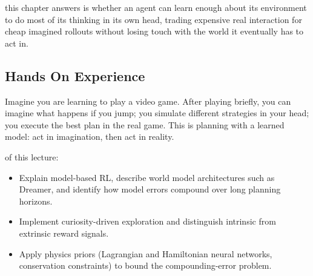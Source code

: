  this chapter answers is whether an agent can learn enough
about its environment to do most of its thinking in its own head,
trading expensive real interaction for cheap imagined rollouts
without losing touch with the world it eventually has to act in.

\newpage

\iffalse
\subsection{Hands On Experience}

\begin{marginfigure}
\caption{World model predicts next state and reward, enabling mental simulation.}
\label{fig:world_model_intro}
\end{marginfigure}

Imagine you are learning to play a video game. After playing briefly, you can imagine what happens if you jump; you simulate different strategies in your head; you execute the best plan in the real game. This is planning with a learned model: act in imagination, then act in reality.

 of this lecture:
\begin{itemize}
    \item Explain model-based RL, describe world model architectures such as Dreamer, and identify how model errors compound over long planning horizons.
    \item Implement curiosity-driven exploration and distinguish intrinsic from extrinsic reward signals.
    \item Apply physics priors (Lagrangian and Hamiltonian neural networks, conservation constraints) to bound the compounding-error problem.
\end{itemize}


